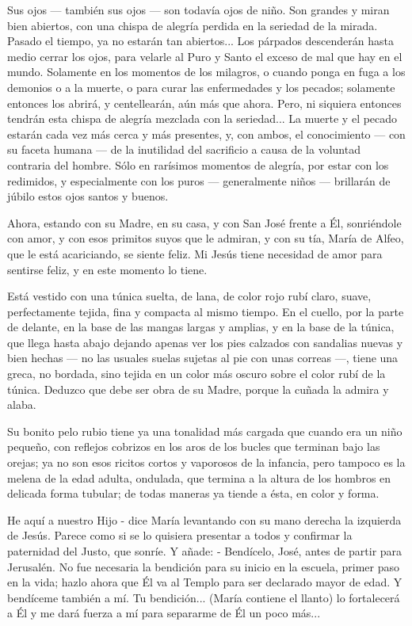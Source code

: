 \documentclass[12pt]{book} %
\begin{document}
Sus ojos — también sus ojos — son todavía ojos de niño. Son grandes y miran bien abiertos, con una chispa de alegría perdida en la seriedad de la mirada. Pasado el tiempo, ya no estarán tan abiertos... Los párpados descenderán hasta medio cerrar los ojos, para velarle al Puro y Santo el exceso de mal que hay en el mundo. Solamente en los momentos de los milagros, o cuando ponga en fuga a los demonios o a la muerte, o para curar las enfermedades y los pecados; solamente entonces los abrirá, y centellearán, aún más que ahora. Pero, ni siquiera entonces tendrán esta chispa de alegría mezclada con la seriedad... La muerte y el pecado estarán cada vez más cerca y más presentes, y, con ambos, el conocimiento — con su faceta humana — de la inutilidad del sacrificio a causa de la voluntad contraria del hombre. Sólo en rarísimos momentos de alegría, por estar con los redimidos, y especialmente con los puros — generalmente niños — brillarán de júbilo estos ojos santos y buenos. 

Ahora, estando con su Madre, en su casa, y con San José frente a Él, sonriéndole con amor, y con esos primitos suyos que le admiran, y con su tía, María de Alfeo, que le está acariciando, se siente feliz. Mi Jesús tiene necesidad de amor para sentirse feliz, y en este momento lo tiene. 

Está vestido con una túnica suelta, de lana, de color rojo rubí claro, suave, perfectamente tejida, fina y compacta al mismo tiempo. En el cuello, por la parte de delante, en la base de las mangas largas y amplias, y en la base de la túnica, que llega hasta abajo dejando apenas ver los pies calzados con sandalias nuevas y bien hechas — no las usuales suelas sujetas al pie con unas correas —, tiene una greca, no bordada, sino tejida en un color más oscuro sobre el color rubí de la túnica. Deduzco que debe ser obra de su Madre, porque la cuñada la admira y alaba. 

Su bonito pelo rubio tiene ya una tonalidad más cargada que cuando era un niño pequeño, con reflejos cobrizos en los aros de los bucles que terminan bajo las orejas; ya no son esos ricitos cortos y vaporosos de la infancia, pero tampoco es la melena de la edad adulta, ondulada, que termina a la altura de los hombros en delicada forma tubular; de todas maneras ya tiende a ésta, en color y forma. 

He aquí a nuestro Hijo - dice María levantando con su mano derecha la izquierda de Jesús. Parece como si se lo quisiera presentar a todos y confirmar la paternidad del Justo, que sonríe. Y añade: - Bendícelo, José, antes de partir para Jerusalén. No fue necesaria la bendición para su inicio en la escuela, primer paso en la vida; hazlo ahora que Él va al Templo para ser declarado mayor de edad. Y bendíceme también a mí. Tu bendición... (María contiene el llanto) lo fortalecerá a Él y me dará fuerza a mí para separarme de Él un poco más... 
\end{document}
